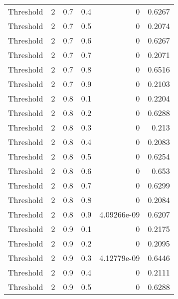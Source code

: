 \documentclass{article}
\begin{document}
\begin{longtable}[H]{lrrrrr}
 Threshold      &       2 &   0.7 &            0.4 &      0           &          0.6267 \\
 Threshold      &       2 &   0.7 &            0.5 &      0           &          0.2074 \\
 Threshold      &       2 &   0.7 &            0.6 &      0           &          0.6267 \\
 Threshold      &       2 &   0.7 &            0.7 &      0           &          0.2071 \\
 Threshold      &       2 &   0.7 &            0.8 &      0           &          0.6516 \\
 Threshold      &       2 &   0.7 &            0.9 &      0           &          0.2103 \\
 Threshold      &       2 &   0.8 &            0.1 &      0           &          0.2204 \\
 Threshold      &       2 &   0.8 &            0.2 &      0           &          0.6288 \\
 Threshold      &       2 &   0.8 &            0.3 &      0           &          0.213  \\
 Threshold      &       2 &   0.8 &            0.4 &      0           &          0.2083 \\
 Threshold      &       2 &   0.8 &            0.5 &      0           &          0.6254 \\
 Threshold      &       2 &   0.8 &            0.6 &      0           &          0.653  \\
 Threshold      &       2 &   0.8 &            0.7 &      0           &          0.6299 \\
 Threshold      &       2 &   0.8 &            0.8 &      0           &          0.2084 \\
 Threshold      &       2 &   0.8 &            0.9 &      4.09266e-09 &          0.6207 \\
 Threshold      &       2 &   0.9 &            0.1 &      0           &          0.2175 \\
 Threshold      &       2 &   0.9 &            0.2 &      0           &          0.2095 \\
 Threshold      &       2 &   0.9 &            0.3 &      4.12779e-09 &          0.6446 \\
 Threshold      &       2 &   0.9 &            0.4 &      0           &          0.2111 \\
 Threshold      &       2 &   0.9 &            0.5 &      0           &          0.6288 \\

\end{longtable}
\end{document}
